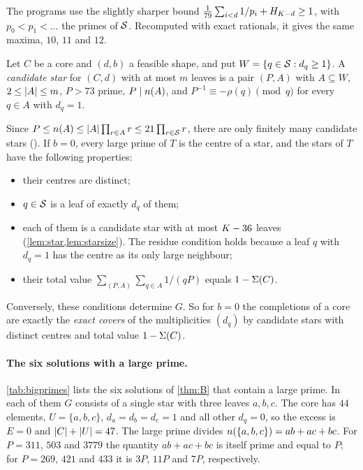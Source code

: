 \documentclass[11pt]{article}
\begin{document}
The programs use the slightly sharper bound $\frac1{79}\sum_{i<d}1/p_i+H_{K-d}\ge1$, with $p_0<p_1<\dots$ the primes of $\mathcal{S}$. Recomputed with exact rationals, it gives the same maxima, $10$, $11$ and $12$.

\begin{definition}\label{def:candidate}
Let $C$ be a core and $(d,b)$ a feasible shape, and put $W=\{q\in\mathcal{S}: d_q\ge1\}$. A \emph{candidate star} for $(C,d)$ with at most $m$ leaves is a pair $(P,A)$ with $A\subseteq W$, $2\le\lvert A\rvert\le m$, $P>73$ prime, $P\mid n(A)$, and $P^{-1}\equiv-\rho(q)\pmod q$ for every $q\in A$ with $d_q=1$.
\end{definition}

Since $P\le n(A)\le\lvert A\rvert\prod_{r\in A}r\le 21\prod_{r\in\mathcal{S}}r$, there are only finitely many candidate stars ().
If $b=0$, every large prime of $T$ is the centre of a star, and the stars of $T$ have the following properties:
\begin{itemize}
\item their centres are distinct;
\item $q\in\mathcal{S}$ is a leaf of exactly $d_q$ of them;
\item each of them is a candidate star with at most $K-36$ leaves (\cref{lem:star,lem:starsize}). The residue condition holds because a leaf $q$ with $d_q=1$ has the centre as its only large neighbour;
\item their total value $\sum_{(P,A)}\sum_{q\in A}1/(qP)$ equals $1-\Sigma(C)$.
\end{itemize}
Conversely, these conditions determine $G$. So for $b=0$ the completions of a core are exactly the \emph{exact covers} of the multiplicities $(d_q)$ by candidate stars with distinct centres and total value $1-\Sigma(C)$.

\paragraph{The six solutions with a large prime.}
\cref{tab:bigprimes} lists the six solutions of \cref{thm:B} that contain a large prime.
In each of them $G$ consists of a single star with three leaves $a,b,c$. The core has $44$ elements, $U=\{a,b,c\}$, $d_a=d_b=d_c=1$ and all other $d_q=0$, so the excess is $E=0$ and $\lvert C\rvert+\lvert U\rvert=47$. The large prime divides $n(\{a,b,c\})=ab+ac+bc$.
For $P=311$, $503$ and $3779$ the quantity $ab+ac+bc$ is itself prime and equal to $P$; for $P=269$, $421$ and $433$ it is $3P$, $11P$ and $7P$, respectively.
\end{document}
